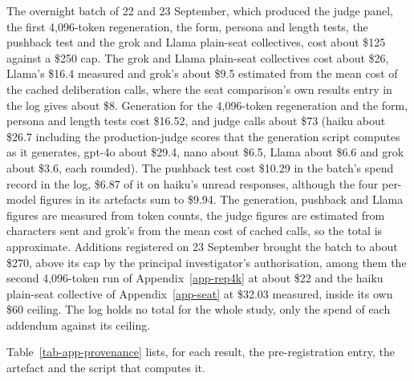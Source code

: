 The overnight batch of 22 and 23 September, which produced the judge panel,
the first 4,096-token regeneration, the form, persona and length tests, the
pushback test and the grok and Llama plain-seat collectives, cost about \$125
against a \$250 cap. The grok and Llama plain-seat collectives cost about
\$26, Llama's \$16.4 measured and
grok's about \$9.5 estimated from the mean cost of the cached deliberation
calls, where the seat comparison's own results entry in the log gives about
\$8. Generation
for the 4,096-token regeneration and the form, persona and length tests cost
\$16.52, and judge calls about \$73 (haiku about \$26.7 including the
production-judge scores that the generation script computes as it generates, gpt-4o
about \$29.4, nano about \$6.5, Llama about \$6.6 and grok about \$3.6, each
rounded).
The pushback test cost \$10.29 in the batch's spend record in the log, \$6.87 of it on haiku's
unread responses, although the four per-model figures in its artefacts sum to
\$9.94. The generation, pushback and Llama figures are measured from token
counts, the judge figures are estimated from characters sent and grok's from
the mean cost of cached calls, so the total is approximate. Additions
registered on 23 September brought the batch to about \$270, above its cap by
the principal investigator's authorisation, among them the second 4,096-token
run of Appendix~\ref{app-rep4k} at about \$22 and the haiku plain-seat
collective of Appendix~\ref{app-seat} at \$32.03 measured, inside its own
\$60 ceiling.
The log holds no total for the whole study, only the spend of each addendum
against its ceiling.

Table~\ref{tab-app-provenance} lists, for each result, the pre-registration
entry, the artefact and the script that computes it.

